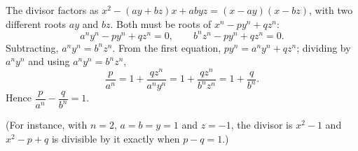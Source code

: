 The divisor factors as $x^2-(ay+bz)x+abyz=(x-ay)(x-bz)$, with two different roots $ay$ and $bz$. Both must be roots of $x^n-py^n+qz^n$:
\[
a^ny^n-py^n+qz^n=0,\qquad b^nz^n-py^n+qz^n=0 .
\]
Subtracting, $a^ny^n=b^nz^n$. From the first equation, $py^n=a^ny^n+qz^n$; dividing by $a^ny^n$ and using $a^ny^n=b^nz^n$,
\[
\dfrac{p}{a^n}=1+\dfrac{qz^n}{a^ny^n}=1+\dfrac{qz^n}{b^nz^n}=1+\dfrac{q}{b^n}.
\]
Hence $\dfrac{p}{a^n}-\dfrac{q}{b^n}=\boxed{1}$.

(For instance, with $n=2$, $a=b=y=1$ and $z=-1$, the divisor is $x^2-1$ and $x^2-p+q$ is divisible by it exactly when $p-q=1$.)

